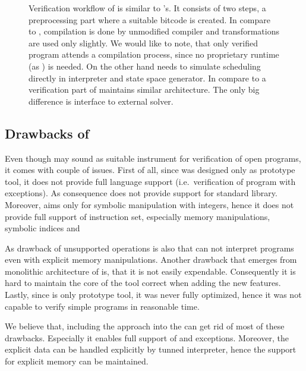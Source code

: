 \begin{figure}[!ht]
{
}
\caption{ Verification workflow of \SymDIVINE is similar to \DIVINE{}'s. It consists
of two steps, a preprocessing part where a suitable \LLVM bitcode is created. In compare to
\DIVINE, compilation is done by unmodified compiler and \LART transformations
are used only slightly. We would like to note, that only verified program
attends a compilation process, since no \SymDIVINE proprietary runtime (as \DIOS) is
needed. On the other hand \SymDIVINE needs to simulate scheduling directly in
interpreter and state space generator. In compare to \DIVINE a verification part
of \SymDIVINE maintains similar architecture. The only big difference is
interface to external \SMT solver.}\label{fig:symdivine}
\end{figure}


\subsection{Drawbacks of \SymDIVINE}
Even though \SymDIVINE may sound as suitable instrument for verification of open
programs, it comes with couple of issues. First of all, since \SymDIVINE was
designed only as prototype tool, it does not provide full \Cpp{} language support
(i.e.~verification of program with exceptions). As consequence \SymDIVINE does
not provide support for \Cpp{} standard library. Moreover, \SymDIVINE aims only
for symbolic manipulation with integers, hence it does not provide full support
of \LLVM instruction set, especially memory manipulations, symbolic indices and

As drawback of unsupported operations is also that \SymDIVINE can not interpret
programs even with explicit memory manipulations. Another drawback that emerges
from monolithic architecture of \SymDIVINE is, that it is not easily expendable.
Consequently it is hard to maintain the core of the tool correct when adding the
new features. Lastly, since \SymDIVINE is only prototype tool, it was never
fully optimized, hence it was not capable to verify simple programs in reasonable
time.

We believe that, including the \SymDIVINE approach into the \DIVINE can get rid
of most of these drawbacks. Especially it enables full support of \LLVM and
\Cpp{} exceptions. Moreover, the explicit data can be handled explicitly by
tunned \DIVINE interpreter, hence the support for explicit memory can be
maintained.

